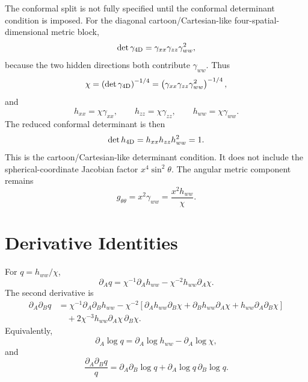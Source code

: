 \documentclass[11pt]{article}
\begin{document}
The conformal split is not fully specified until the conformal determinant
condition is imposed. For the diagonal cartoon/Cartesian-like
four-spatial-dimensional metric block,
\begin{equation}
  \det\gamma_{\rm 4D}
  =
  \gamma_{xx}\gamma_{zz}\gamma_{ww}^2,
\end{equation}
because the two hidden directions both contribute \(\gamma_{ww}\). Thus
\begin{equation}
  \chi
  =
  \left(\det\gamma_{\rm 4D}\right)^{-1/4}
  =
  \left(\gamma_{xx}\gamma_{zz}\gamma_{ww}^2\right)^{-1/4},
\end{equation}
and
\begin{equation}
  h_{xx}=\chi\gamma_{xx},
  \qquad
  h_{zz}=\chi\gamma_{zz},
  \qquad
  h_{ww}=\chi\gamma_{ww}.
\end{equation}
The reduced conformal determinant is then
\begin{equation}
  \det h_{\rm 4D}=h_{xx}h_{zz}h_{ww}^2=1.
\end{equation}
This is the cartoon/Cartesian-like determinant condition. It does not include
the spherical-coordinate Jacobian factor \(x^4\sin^2\theta\). The angular
metric component remains
\begin{equation}
  g_{\theta\theta}
  =
  x^2\gamma_{ww}
  =
  \frac{x^2h_{ww}}{\chi}.
\end{equation}

\section{Derivative Identities}

For \(q=h_{ww}/\chi\),
\begin{equation}
  \partial_A q
  =
  \chi^{-1}\partial_A h_{ww}
  -
  \chi^{-2}h_{ww}\partial_A\chi .
\end{equation}
The second derivative is
\begin{align}
  \partial_A\partial_B q
  &=
  \chi^{-1}\partial_A\partial_B h_{ww}
  -
  \chi^{-2}
  \left[
    \partial_A h_{ww}\partial_B\chi
    +
    \partial_B h_{ww}\partial_A\chi
    +
    h_{ww}\partial_A\partial_B\chi
  \right] \nonumber\\
  &\quad
  +
  2\chi^{-3}h_{ww}\partial_A\chi\,\partial_B\chi.
\end{align}
Equivalently,
\begin{equation}
  \partial_A\log q
  =
  \partial_A\log h_{ww}
  -
  \partial_A\log\chi,
\end{equation}
and
\begin{equation}
  \frac{\partial_A\partial_B q}{q}
  =
  \partial_A\partial_B\log q
  +
  \partial_A\log q\,\partial_B\log q.
\end{equation}
\end{document}
